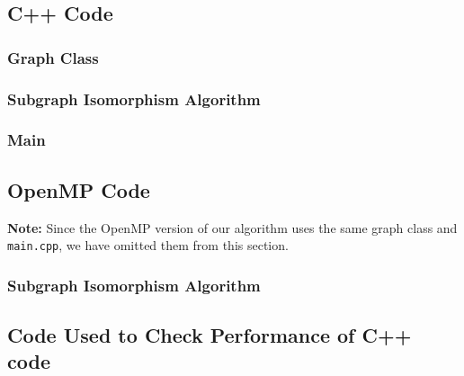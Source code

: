 \documentclass{article}
\begin{document}
  \subsection{C++ Code}
    \subsubsection{Graph Class}
      
    \subsubsection{Subgraph Isomorphism Algorithm}
      
    \subsubsection{Main}
      

  \subsection{OpenMP Code}
    \textbf{Note:} Since the OpenMP version of our algorithm uses the same graph class and \texttt{main.cpp}, we have omitted them from this section.

    \subsubsection{Subgraph Isomorphism Algorithm}
      

  \subsection{Code Used to Check Performance of C++ code}
    

  \printbibliography[heading=bibintoc,
                     title={References}]
\end{document}
